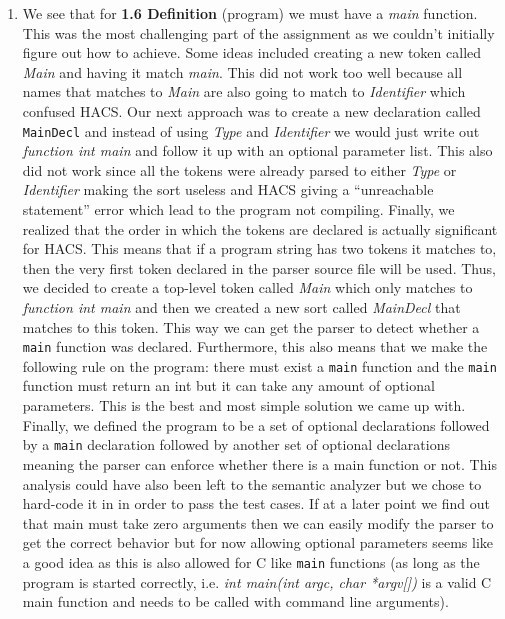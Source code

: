 \documentclass{article}
\begin{document}
\begin{enumerate}
    \item We see that for \textbf{1.6 Definition} (program) we must have a \textit{main} function. This was the most challenging part of the assignment as we couldn't initially figure out how to achieve. Some ideas included creating a new token called \textit{Main} and having it match \textit{main}. This did not work too well because all names that matches to \textit{Main} are also going to match to \textit{Identifier} which confused HACS. Our next approach was to create a new declaration called \texttt{MainDecl} and instead of using \textit{Type} and \textit{Identifier} we would just write out \textit{function int main} and follow it up with an optional parameter list. This also did not work since all the tokens were already parsed to either \textit{Type} or \textit{Identifier} making the sort useless and HACS giving a ``unreachable statement'' error which lead to the program not compiling. Finally, we realized that the order in which the tokens are declared is actually significant for HACS. This means that if a program string has two tokens it matches to, then the very first token declared in the parser source file will be used. Thus, we decided to create a top-level token called \textit{Main} which only matches to \textit{function int main} and then we created a new sort called \textit{MainDecl} that matches to this token. This way we can get the parser to detect whether a \texttt{main} function was declared. Furthermore, this also means that we make the following rule on the program: there must exist a \texttt{main} function and the \texttt{main} function must return an int but it can take any amount of optional parameters. This is the best and most simple solution we came up with. Finally, we defined the program to be a set of optional declarations followed by a \texttt{main} declaration followed by another set of optional declarations meaning the parser can enforce whether there is a main function or not. This analysis could have also been left to the semantic analyzer but we chose to hard-code it in in order to pass the test cases. If at a later point we find out that main must take zero arguments then we can easily modify the parser to get the correct behavior but for now allowing optional parameters seems like a good idea as this is also allowed for C like \texttt{main} functions (as long as the program is started correctly, i.e. \textit{int main(int argc, char *argv[])} is a valid C main function and needs to be called with command line arguments).
\end{enumerate}
\end{document}
